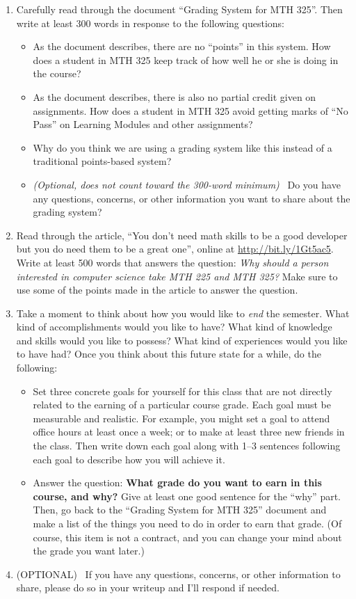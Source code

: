 \documentclass[11pt,letterpaper]{article}
\begin{document}
\begin{enumerate}
	\item Carefully read through the document ``Grading System for MTH 325''. Then write at least 300 words in response to the following questions: 
		\begin{itemize}
			\item As the document describes, there are no ``points'' in this system. How does a student in MTH 325 keep track of how well he or she is doing in the course? 
			\item As the document describes, there is also no partial credit given on assignments. How does a student in MTH 325 avoid getting marks of ``No Pass'' on Learning Modules and other assignments? 
			\item Why do you think we are using a grading system like this instead of a traditional points-based system? 
			\item \emph{(Optional, does not count toward the 300-word minimum)} \ Do you have any questions, concerns, or other information you want to share about the grading system? 
		\end{itemize}

	\item Read through the article, ``You don't need math skills to be a good developer but you do need them to be a great one'', online at \url{http://bit.ly/1Gt5ac5}. Write at least 500 words that answers the question: \emph{Why should a person interested in computer science take MTH 225 and MTH 325?} Make sure to use some of the points made in the article to answer the question. 

	\item Take a moment to think about how you would like to \emph{end} the semester. What kind of accomplishments would you like to have? What kind of knowledge and skills would you like to possess? What kind of experiences would you like to have had? Once you think about this future state for a while, do the following: 
		\begin{itemize}
			\item Set three concrete goals for yourself for this class that are not directly related to the earning of a particular course grade. Each goal must be measurable and realistic. For example, you might set a goal to attend office hours at least once a week; or to make at least three new friends in the class. Then write down each goal along with 1--3 sentences following each goal to describe how you will achieve it. 
			\item Answer the question: \textbf{What grade do you want to earn in this course, and why?} Give at least one good sentence for the ``why'' part. Then, go back to the ``Grading System for MTH 325'' document and make a list of the things you need to do in order to earn that grade. (Of course, this item is not a contract, and you can change your mind about the grade you want later.) 
		\end{itemize}

	\item (OPTIONAL) \ If you have any questions, concerns, or other information to share, please do so in your writeup and I'll respond if needed. 

\end{enumerate}
\end{document}

